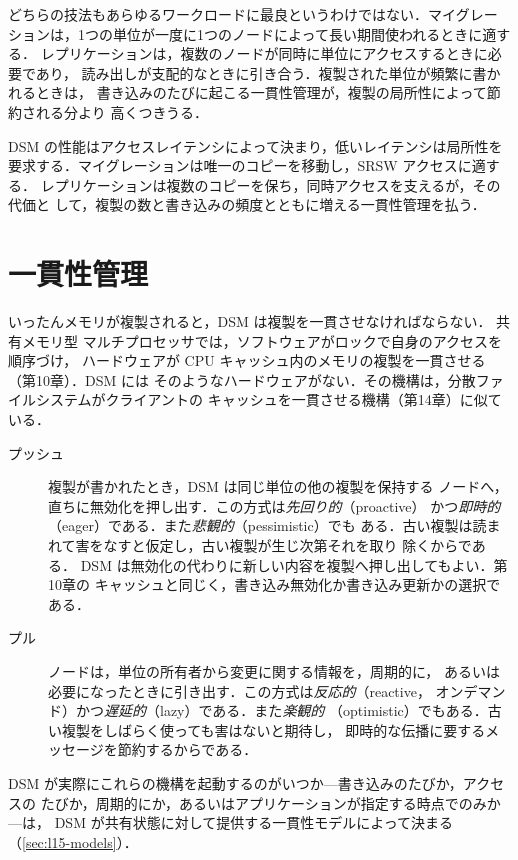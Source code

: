 \documentclass[../main.tex]{subfiles}
\begin{document}
どちらの技法もあらゆるワークロードに最良というわけではない．マイグレー
ションは，1つの単位が一度に1つのノードによって長い期間使われるときに適する．
レプリケーションは，複数のノードが同時に単位にアクセスするときに必要であり，
読み出しが支配的なときに引き合う．複製された単位が頻繁に書かれるときは，
書き込みのたびに起こる一貫性管理が，複製の局所性によって節約される分より
高くつきうる．

\begin{keypoint}
  DSM の性能はアクセスレイテンシによって決まり，低いレイテンシは局所性を
  要求する．マイグレーションは唯一のコピーを移動し，SRSW アクセスに適する．
  レプリケーションは複数のコピーを保ち，同時アクセスを支えるが，その代価と
  して，複製の数と書き込みの頻度とともに増える一貫性管理を払う．
\end{keypoint}

\section{一貫性管理}
\label{sec:l15-management}

いったんメモリが複製されると，DSM は複製を一貫させなければならない．
共有メモリ型
マルチプロセッサでは，ソフトウェアがロックで自身のアクセスを順序づけ，
ハードウェアが CPU キャッシュ内のメモリの複製を一貫させる（第10章）．DSM には
そのようなハードウェアがない．その機構は，分散ファイルシステムがクライアントの
キャッシュを一貫させる機構（第14章）に似ている．
\begin{description}
  \item[プッシュ] 複製が書かれたとき，DSM は同じ単位の他の複製を保持する
    ノードへ，直ちに無効化を押し出す．この方式は\emph{先回り的}（proactive）
    かつ\emph{即時的}（eager）である．また\emph{悲観的}（pessimistic）でも
    ある．古い複製は読まれて害をなすと仮定し，古い複製が生じ次第それを取り
    除くからである．
    DSM は無効化の代わりに新しい内容を複製へ押し出してもよい．第10章の
    キャッシュと同じく，書き込み無効化か書き込み更新かの選択である．
  \item[プル] ノードは，単位の所有者から変更に関する情報を，周期的に，
    あるいは必要になったときに引き出す．この方式は\emph{反応的}（reactive，
    オンデマンド）かつ\emph{遅延的}（lazy）である．また\emph{楽観的}
    （optimistic）でもある．古い複製をしばらく使っても害はないと期待し，
    即時的な伝播に要するメッセージを節約するからである．
\end{description}
DSM が実際にこれらの機構を起動するのがいつか---書き込みのたびか，アクセスの
たびか，周期的にか，あるいはアプリケーションが指定する時点でのみか---は，
DSM が共有状態に対して提供する一貫性モデルによって決まる
（\cref{sec:l15-models}）．
\end{document}
